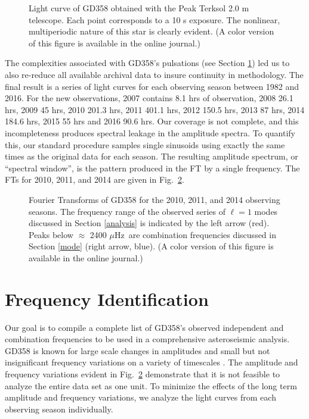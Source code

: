 \documentclass[12pt,preprint]{aastex}
\newcommand{\muHz}{\mbox{$\mu$Hz}}
\begin{document}
\begin{figure}
\caption{Light curve of GD358 obtained with the Peak Terksol 2.0 m telescope.  Each point corresponds 
to a 10 s exposure. The nonlinear, multiperiodic nature of this star is clearly evident.
(A color version of this figure is available in the online journal.)
\label{tersk}
}
\end{figure}

The complexities associated with GD358's pulsations (see Section \ref{freq}) led us to also 
re-reduce all available archival data \citep{Provencal09, Bradley04, Kepler03, Winget94, Winget82} to
insure continuity in methodology. The final result is a series of light curves 
for each observing season between 1982 and 2016. 
For the new observations, 2007 contains 8.1 hrs of observation, 2008 26.1 hrs, 2009 45 hrs, 
2010 201.3 hrs, 2011 401.1 hrs, 2012 150.5 hrs, 2013 87 hrs, 2014 184.6 hrs, 2015 55 hrs and 2016 90.6 hrs. 
Our coverage is not complete, and this incompleteness produces spectral leakage in the 
amplitude spectra. To quantify this, our standard procedure samples single sinusoids using exactly the 
same times as the original data for each season. The resulting amplitude spectrum, 
or ``spectral window'', is the pattern produced in the FT by a single frequency. 
The FTs for 2010, 2011, and 2014 are given in Fig.~\ref{fts}.


\begin{figure}
\caption{Fourier Transforms of GD358 for the 2010, 2011, and 2014 observing seasons.
The frequency range of the observed series of $\ell=1$ modes discussed in Section \ref{analysis} 
is indicated by the left arrow (red).  Peaks below $\approx$ 2400 \muHz\ are combination 
frequencies discussed in Section \ref{mode} (right arrow, blue). 
(A color version of this figure is available in the online journal.)
\label{fts}
}
\end{figure}

\section{Frequency Identification}\label{freq}
 
Our goal is to compile a complete list of GD358's observed independent and combination frequencies 
to be used in a comprehensive asteroseismic analysis. GD358 is known for large scale changes in 
amplitudes and small but not insignificant frequency variations on a variety of timescales 
\citep{Provencal09, Kepler03}.  The amplitude and frequency variations evident in Fig.~\ref{fts} demonstrate that 
it is not feasible to analyze the entire data set as one unit. To minimize the effects of the long term  
amplitude and frequency variations, we analyze the light curves from each observing season individually.
\end{document}
